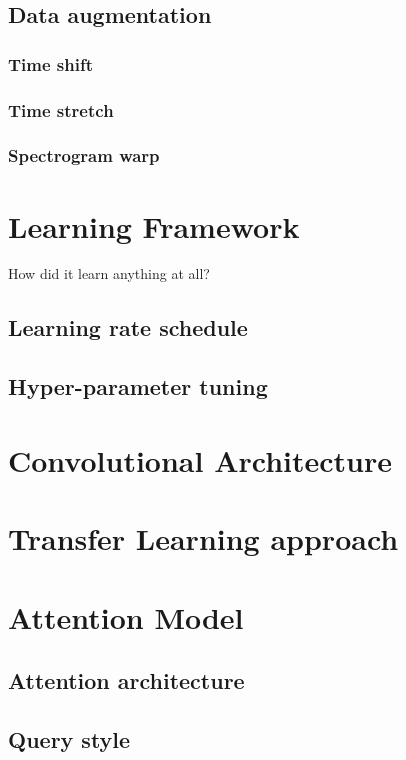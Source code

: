 
\subsection{Data augmentation}

\subsubsection{Time shift}

\subsubsection{Time stretch}

\subsubsection{Spectrogram warp}

\section{Learning Framework}
\label{sec:learning_framework}

How did it learn anything at all?

\subsection{Learning rate schedule}

\subsection{Hyper-parameter tuning}

\section{Convolutional Architecture}
\label{sec:convolutional_arch}

\section{Transfer Learning approach}
\label{sec:transfer_learning}

\section{Attention Model}
\label{sec:attention_model}

\subsection{Attention architecture}

\subsection{Query style}
